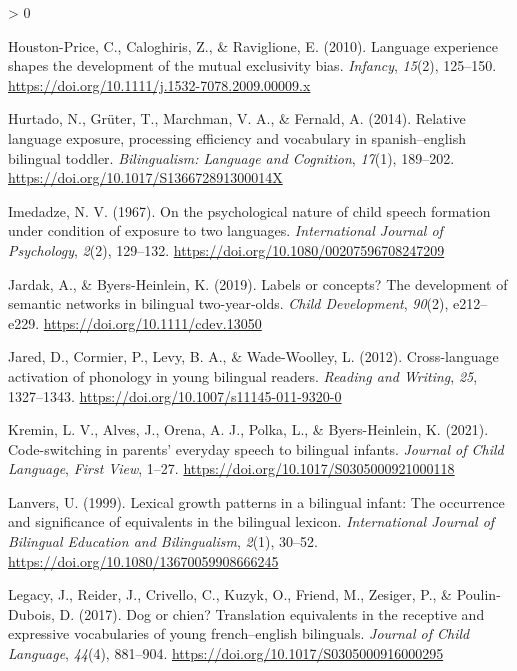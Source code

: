 \documentclass[
  english,
  ,man,floatsintext]{apa6}
\newlength{\cslhangindent}
\newenvironment{CSLReferences}[2] %
 {%
  \setlength{\parindent}{0pt}
  \ifodd #1 \everypar{\setlength{\hangindent}{\cslhangindent}}\ignorespaces\fi
  \ifnum #2 > 0
  \setlength{\parskip}{#2\baselineskip}
  \fi
 }%
 {}
\begin{document}
\begin{CSLReferences}{1}{0}
\leavevmode\hypertarget{ref-Houston-Price_etal_2010}{}%
Houston-Price, C., Caloghiris, Z., \& Raviglione, E. (2010). Language experience shapes the development of the mutual exclusivity bias. \emph{Infancy}, \emph{15}(2), 125--150. \url{https://doi.org/10.1111/j.1532-7078.2009.00009.x}

\leavevmode\hypertarget{ref-Hurtado_etal_2014}{}%
Hurtado, N., Grüter, T., Marchman, V. A., \& Fernald, A. (2014). Relative language exposure, processing efficiency and vocabulary in spanish--english bilingual toddler. \emph{Bilingualism: Language and Cognition}, \emph{17}(1), 189--202. \url{https://doi.org/10.1017/S136672891300014X}

\leavevmode\hypertarget{ref-Imedadze_1967}{}%
Imedadze, N. V. (1967). On the psychological nature of child speech formation under condition of exposure to two languages. \emph{International Journal of Psychology}, \emph{2}(2), 129--132. \url{https://doi.org/10.1080/00207596708247209}

\leavevmode\hypertarget{ref-Jardak_Byers-Heinlein_2019}{}%
Jardak, A., \& Byers-Heinlein, K. (2019). Labels or concepts? The development of semantic networks in bilingual two-year-olds. \emph{Child Development}, \emph{90}(2), e212--e229. \url{https://doi.org/10.1111/cdev.13050}

\leavevmode\hypertarget{ref-Jared_etal_2012}{}%
Jared, D., Cormier, P., Levy, B. A., \& Wade-Woolley, L. (2012). Cross-language activation of phonology in young bilingual readers. \emph{Reading and Writing}, \emph{25}, 1327--1343. \url{https://doi.org/10.1007/s11145-011-9320-0}

\leavevmode\hypertarget{ref-Kremin_etal_2021}{}%
Kremin, L. V., Alves, J., Orena, A. J., Polka, L., \& Byers-Heinlein, K. (2021). Code-switching in parents' everyday speech to bilingual infants. \emph{Journal of Child Language}, \emph{First View}, 1--27. \url{https://doi.org/10.1017/S0305000921000118}

\leavevmode\hypertarget{ref-Lanvers_1999}{}%
Lanvers, U. (1999). Lexical growth patterns in a bilingual infant: The occurrence and significance of equivalents in the bilingual lexicon. \emph{International Journal of Bilingual Education and Bilingualism}, \emph{2}(1), 30--52. \url{https://doi.org/10.1080/13670059908666245}

\leavevmode\hypertarget{ref-Legacy_etal_2017}{}%
Legacy, J., Reider, J., Crivello, C., Kuzyk, O., Friend, M., Zesiger, P., \& Poulin-Dubois, D. (2017). Dog or chien? Translation equivalents in the receptive and expressive vocabularies of young french--english bilinguals. \emph{Journal of Child Language}, \emph{44}(4), 881--904. \url{https://doi.org/10.1017/S0305000916000295}


\end{CSLReferences}
\end{document}

